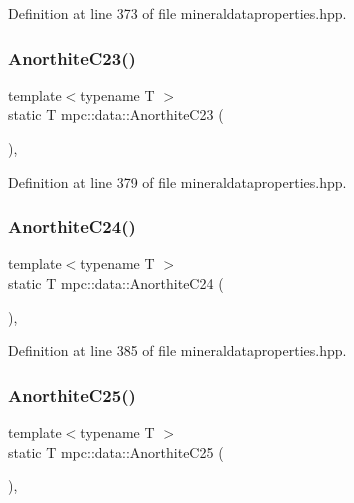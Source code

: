 Definition at line 373 of file mineraldataproperties.\+hpp.

\mbox{\label{namespacempc_1_1data_a68db2cfdb2ca70be269855a319bcb39a}} 
\subsubsection{\texorpdfstring{Anorthite\+C23()}{AnorthiteC23()}}
{\footnotesize\ttfamily template$<$typename T $>$ \\
static T mpc\+::data\+::\+Anorthite\+C23 (\begin{DoxyParamCaption}{ }\end{DoxyParamCaption})\hspace{0.3cm}{\ttfamily [inline]}, {\ttfamily [static]}}



Definition at line 379 of file mineraldataproperties.\+hpp.

\mbox{\label{namespacempc_1_1data_a1368e877e57345cd2293ce7812046f6a}} 
\subsubsection{\texorpdfstring{Anorthite\+C24()}{AnorthiteC24()}}
{\footnotesize\ttfamily template$<$typename T $>$ \\
static T mpc\+::data\+::\+Anorthite\+C24 (\begin{DoxyParamCaption}{ }\end{DoxyParamCaption})\hspace{0.3cm}{\ttfamily [inline]}, {\ttfamily [static]}}



Definition at line 385 of file mineraldataproperties.\+hpp.

\mbox{\label{namespacempc_1_1data_a61e902e6c095b9c860c75321a8c5685e}} 
\subsubsection{\texorpdfstring{Anorthite\+C25()}{AnorthiteC25()}}
{\footnotesize\ttfamily template$<$typename T $>$ \\
static T mpc\+::data\+::\+Anorthite\+C25 (\begin{DoxyParamCaption}{ }\end{DoxyParamCaption})\hspace{0.3cm}{\ttfamily [inline]}, {\ttfamily [static]}}



